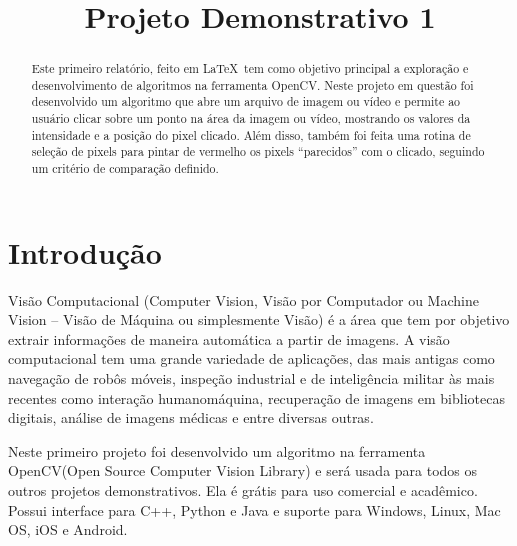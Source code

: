 \documentclass{bmvc2k}
\title{Projeto Demonstrativo 1}
\begin{document}
\maketitle

\begin{abstract}
Este primeiro relatório, feito em \LaTeX\, tem como objetivo principal a exploração e desenvolvimento de algoritmos na ferramenta OpenCV. Neste projeto em questão foi desenvolvido um algoritmo que abre um arquivo de imagem ou vídeo e permite ao usuário clicar sobre um ponto na área da imagem ou vídeo, mostrando os valores da intensidade e a posição do pixel clicado. Além disso, também foi feita uma rotina de seleção de pixels para pintar de vermelho os pixels ``parecidos'' com o clicado, seguindo um critério de comparação definido. 
\end{abstract}

\section{Introdução}
\label{sec:intro}
Visão Computacional (Computer Vision, Visão por Computador ou Machine Vision – Visão de Máquina
ou simplesmente Visão) é a área que tem por objetivo extrair informações de maneira automática a
partir de imagens. A visão computacional tem uma grande variedade de aplicações, das mais antigas como navegação de robôs móveis, inspeção industrial e de inteligência militar às mais recentes como interação humanomáquina, recuperação de imagens em bibliotecas digitais, análise de imagens médicas e entre diversas outras.


Neste primeiro projeto foi desenvolvido um algoritmo na ferramenta OpenCV(Open Source Computer Vision Library) e será usada para todos os outros projetos demonstrativos. Ela é grátis para uso comercial e acadêmico. Possui interface para C++, Python e Java e suporte para Windows, Linux, Mac OS, iOS e Android.
\end{document}
